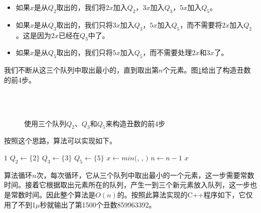 \documentclass{article}
\begin{document}
\begin{itemize}
\item 如果$x$是从$Q_2$取出的，我们将$2x$加入$Q_2$，$3x$加入$Q_3$，$5x$加入$Q_5$。
\item 如果$x$是从$Q_3$取出的，我们只将$3x$加入$Q_3$，$5x$加入$Q_5$，而不需要将$2x$加入$Q_2$。这是因为$2x$已经在$Q_3$中了。
\item 如果$x$是从$Q_5$取出的，我们只将$5x$加入$Q_5$，而不需要处理$2x$和$3x$了。
\end{itemize}

我们不断从这三个队列中取出最小的，直到取出第$n$个元素。图\ref{fig:q235}给出了构造丑数的前4步。

\begin{figure}[htbp]
  \centering
   \\
   \\
  \caption{使用三个队列$Q_2$、$Q_3$和$Q_5$来构造丑数的前4步}
  \label{fig:q235}
\end{figure}

按照这个思路，算法可以实现如下。

\begin{algorithmic}[1]
    \State \Return $1$
  \Else
    \State $Q_2 \gets \{ 2 \}$
    \State $Q_3 \gets \{ 3 \}$
    \State $Q_5 \gets \{ 5 \}$
      \State $x \gets min($, , $)$
        \State {}
        \State {}
        \State {}
        \State {}
        \State {}
        \State {}
        \State {}
      \Else
        \State {}
        \State {}
      \EndIf
      \State $n \gets n - 1$
    \EndWhile
    \State \Return $x$
  \EndIf
\EndFunction
\end{algorithmic}

算法循环$n$次，每次循环，它从三个队列中取出最小的一个元素，这一步需要常数时间。接着它根据取出元素所在的队列，产生一到三个新元素放入队列，这一步也是常数时间。因此整个算法是$O(n)$的。按照此算法实现的C++程序如下，它仅用了不到1$\mu$秒就输出了第1500个丑数859963392。
\end{document}

